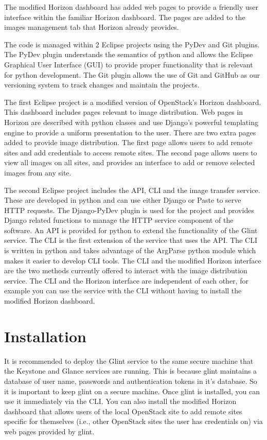 \documentclass[a4paper]{jpconf}
\begin{document}
The modified Horizon dashboard has added web pages to provide a friendly user interface within the familiar Horizon dashboard. The pages are added to the images management tab that Horizon already provides. 

The code is managed within 2 Eclipse projects using the PyDev and Git plugins. The PyDev plugin understands the semantics of python and allows the Eclipse Graphical User Interface (GUI) to provide proper functionality that is relevant for python development. The Git plugin allows the use of Git and GitHub as our versioning system to track changes and maintain the projects. 

The first Eclipse project is a modified version of OpenStack's Horizon dashboard. This dashboard includes pages relevant to image distribution. Web pages in Horizon are described with python classes and use Django's powerful templating engine to provide a uniform presentation to the user. There are two extra pages added to provide image distribution. The first page allows users to add remote sites and add credentials to access remote sites. The second page allows users to view all images on all sites, and provides an interface to add or remove selected images from any site.

The second Eclipse project includes the API, CLI and the image transfer service. These are developed in python and can use either Django or Paste to serve HTTP requests. The Django-PyDev plugin is used for the project and provides Django related functions to manage the HTTP service component of the software. An API is provided for python to extend the functionality of the Glint service. The CLI is the first extension of the service that uses the API. The CLI is written in python and takes advantage of the ArgParse python module which makes it easier to develop CLI tools. The CLI and the modified Horizon interface are the two methods currently offered to interact with the image distribution service. The CLI and the Horizon interface are independent of each other, for example you can use the service with the CLI without having to install the modified Horizon dashboard.


\section{Installation}
It is recommended to deploy the Glint service to the same secure machine that the Keystone and Glance services are running. This is because glint maintains a database of user name, passwords and authentication tokens in it's database. So it is important to keep glint on a secure machine. Once glint is installed, you can use it immediately via the CLI. You can also install the modified Horizon dashboard that allows users of the local OpenStack site to add remote sites specific for themselves (i.e., other OpenStack sites the user has credentials on) via web pages provided by glint.  
\end{document}
